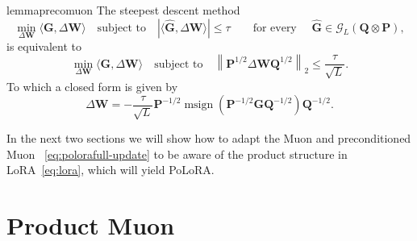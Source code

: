 \documentclass[11pt]{article}
\newcommand{\mat}[1]{\bm{#1}}
\newcommand{\ip}[1]{\langle #1 \rangle}
\DeclareMathOperator{\msign}{msign}          %
\newcommand{\methodname}{PoLoRA\xspace}
\begin{document}
\begin{restatable}{lemma}{precomuon} 
\label{lem:precond-muon}
The steepest descent method
\begin{equation}\label{eq:precond-muon-super}
    \min_{\Delta\mat{W}} \ip{\mat{G}, \Delta\mat{W}} \quad \mbox{subject to} \quad |\ip{\hat{\mat{G}},\Delta\mat{W}}| \le \tau \qquad \text{for  every } \quad\hat{\mat{G}} \in \mathcal{G}_L(\mat{Q} \otimes \mat{P}),
\end{equation}
is equivalent to
\begin{equation}\label{eq:precond-muon-constraint}
\min_{\Delta\mat{W}} \ip{\mat{G}, \Delta\mat{W}} \quad \mbox{subject to} \quad \left\| \mat{P}^{1/2} \Delta\mat{W} \mat{Q}^{1/2} \right\|_2 \le \frac{\tau}{\sqrt L}.
\end{equation}
To which a closed form is given by
\begin{equation} \label{eq:polorafull-update}
 \Delta\mat{W} = -\frac{\tau}{\sqrt L} \mat{P}^{-1/2} \msign(\mat{P}^{-1/2} \mat{G} \mat{Q}^{-1/2}) \mat{Q}^{-1/2}.
\end{equation}
\end{restatable}
In the next two sections we will show how to adapt the Muon and preconditioned Muon ~\eqref{eq:polorafull-update} to be aware of the product structure in LoRA~\eqref{eq:lora}, which will yield \methodname{}.


\section{Product Muon}\label{sec:product-muon}
\end{document}
